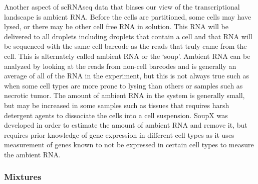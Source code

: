 \par{
Another aspect of scRNAseq data that biases our view of the transcriptional landscape is ambient RNA. Before the cells are partitioned, some cells may have lysed, or there may be other cell free RNA in solution. This RNA will be delivered to all droplets including droplets that contain a cell and that RNA will be sequenced with the same cell barcode as the reads that truly came from the cell. This is alternately called ambient RNA or the `soup'. Ambient RNA can be analyzed by looking at the reads from non-cell barcodes and is generally an average of all of the RNA in the experiment, but this is not always true such as when some cell types are more prone to lysing than others or samples such as necrotic tumor. The amount of ambient RNA in the system is generally small, but may be increased in some samples such as tissues that requires harsh detergent agents to dissociate the cells into a cell suspension. SoupX was developed in order to estimate the amount of ambient RNA and remove it\cite{soupx}, but requires prior knowledge of gene expression in different cell types as it uses measurement of genes known to not be expressed in certain cell types to measure the ambient RNA. 
}

\subsubsection{Mixtures}

